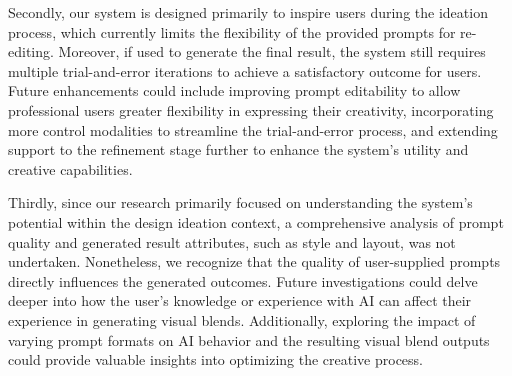 Secondly, our system is designed primarily to inspire users during the ideation process, which currently limits the flexibility of the provided prompts for re-editing.
Moreover, if used to generate the final result, the system still requires multiple trial-and-error iterations to achieve a satisfactory outcome for users. 
Future enhancements could include improving prompt editability to allow professional users greater flexibility in expressing their creativity, incorporating more control modalities to streamline the trial-and-error process, and extending support to the refinement stage further to enhance the system’s utility and creative capabilities.



Thirdly, since our research primarily focused on understanding the system's potential within the design ideation context, a comprehensive analysis of prompt quality and generated result attributes, such as style and layout, was not undertaken.
Nonetheless, we recognize that the quality of user-supplied prompts directly influences the generated outcomes.
Future investigations could delve deeper into how the user's knowledge or experience with AI can affect their experience in generating visual blends. Additionally, exploring the impact of varying prompt formats on AI behavior and the resulting visual blend outputs could provide valuable insights into optimizing the creative process.


